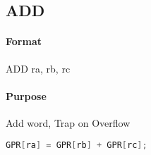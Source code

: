 \subsection{ADD}


\paragraph{Format} ADD ra, rb, rc

\paragraph{Purpose} Add word, Trap on Overflow

\begin{lstlisting}[language=C]
    GPR[ra] = GPR[rb] + GPR[rc];
\end{lstlisting}